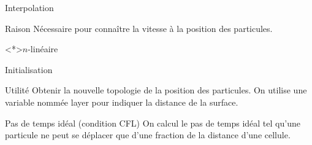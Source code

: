 \begin{frame}[<+->]{Interpolation}
\begin{block}{Raison}
 Nécessaire pour connaître la vitesse à la position des particules.
\end{block}

 \begin{block}<*>{$n$-linéaire}
 \end{block}

\end{frame}


\begin{frame}[<+->]{Initialisation}
 
 \begin{block}{Utilité}
  Obtenir la nouvelle topologie de la position des particules.
  On utilise une variable  nommée layer pour indiquer la distance de la surface.
 \end{block}

 \begin{block}{Pas de temps idéal (condition CFL)}
  On calcul le pas de temps idéal tel qu'une particule ne peut se déplacer que d'une fraction de la distance d'une cellule.
 \end{block}


\end{frame}




